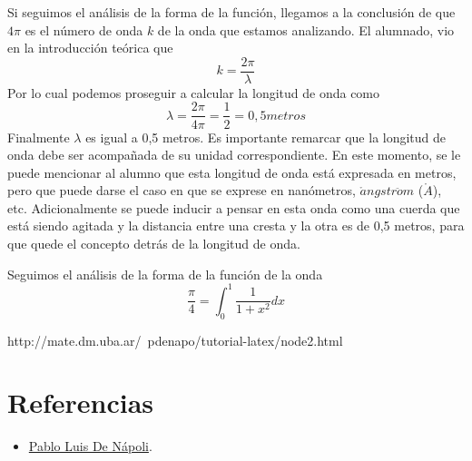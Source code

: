 \documentclass[spanish] {article}
\begin{document}
Si seguimos el análisis de la forma de la función, llegamos a la conclusión de que $4 \pi$ es el número de onda $k$ de la onda que estamos analizando. El alumnado, vio en la introducción teórica que 
$$ k = \frac{2\pi}{\lambda}$$
Por lo cual podemos proseguir a calcular la longitud de onda como
$$ \lambda = \frac{2\pi}{4\pi} = \frac{1}{2} = 0,5 metros$$ 
Finalmente $\lambda$ es igual a 0,5 metros. Es importante remarcar que la longitud de onda debe ser acompañada de su unidad correspondiente. En este momento, se le puede mencionar al alumno que esta longitud de onda está expresada en metros, pero que puede darse el caso en que se exprese en nanómetros, $\mathring{a}ngstr\ddot{o}m$ ($\mathring{A}$), etc.
Adicionalmente se puede inducir a pensar en esta onda como una cuerda que está siendo agitada y la distancia entre una cresta y la otra es de 0,5 metros, para que quede el concepto detrás de la longitud de onda.

Seguimos el análisis de la forma de la función de la onda 
$$ \frac{\pi}{4} = \int_0^1 \frac{1}{1+x^2} dx $$


http://mate.dm.uba.ar/~pdenapo/tutorial-latex/node2.html
\newpage
\section{Referencias}

\begin{itemize}
  \item \href{http://mate.dm.uba.ar/~pdenapo/tutorial-latex/node2.html}{Pablo Luis De Nápoli}.
\end{itemize}
\end{document}

